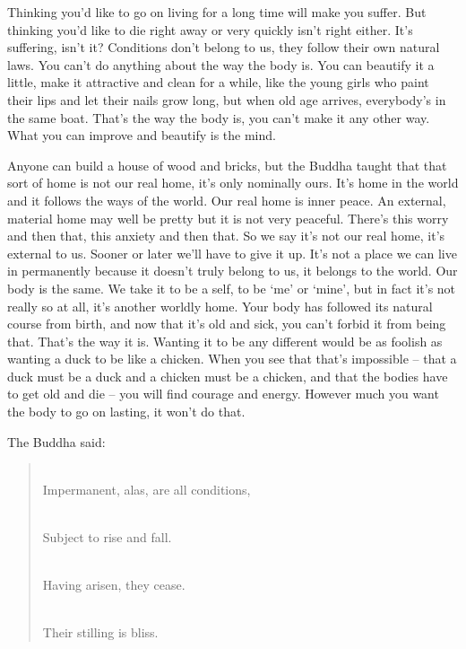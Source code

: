 Thinking you'd like to go on living for a long time will make you suffer. But thinking you'd like to die right away or very quickly isn't right either. It's suffering, isn't it? Conditions don't belong to us, they follow their own natural laws. You can't do anything about the way the body is. You can beautify it a little, make it attractive and clean for a while, like the young girls who paint their lips and let their nails grow long, but when old age arrives, everybody's in the same boat. That's the way the body is, you can't make it any other way. What you can improve and beautify is the mind. 

Anyone can build a house of wood and bricks, but the Buddha taught that that sort of home is not our real home, it's only nominally ours. It's home in the world and it follows the ways of the world. Our real home is inner peace. An external, material home may well be pretty but it is not very peaceful. There's this worry and then that, this anxiety and then that. So we say it's not our real home, it's external to us. Sooner or later we'll have to give it up. It's not a place we can live in permanently because it doesn't truly belong to us, it belongs to the world. Our body is the same. We take it to be a self, to be `me' or `mine', but in fact it's not really so at all, it's another worldly home. Your body has followed its natural course from birth, and now that it's old and sick, you can't forbid it from being that. That's the way it is. Wanting it to be any different would be as foolish as wanting a duck to be like a chicken. When you see that that's impossible -- that a duck must be a duck and a chicken must be a chicken, and that the bodies have to get old and die -- you will find courage and energy. However much you want the body to go on lasting, it won't do that. 

The Buddha said:
\begin{verse}
\\
Impermanent, alas, are all conditions,

\\
Subject to rise and fall.

\\
Having arisen, they cease.

\\
Their stilling is bliss. 
\end{verse}


